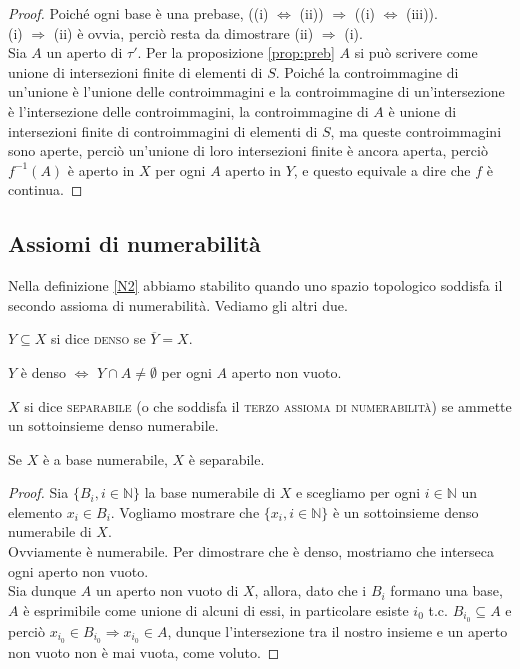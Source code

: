 \documentclass{article}
\begin{document}
\begin{proof}
	Poiché ogni base è una prebase, ((i) $\Leftrightarrow$ (ii)) $\Rightarrow$ ((i) $\Leftrightarrow$ (iii)). \\
	(i) $\Rightarrow$ (ii) è ovvia, perciò resta da dimostrare (ii) $\Rightarrow$ (i). \\
	Sia $A$ un aperto di $\tau'$. Per la proposizione \ref{prop:preb} $A$ si può scrivere come unione di intersezioni finite di elementi di $S$. Poiché la controimmagine di un'unione è l'unione delle controimmagini e la controimmagine di un'intersezione è l'intersezione delle controimmagini, la controimmagine di $A$ è unione di intersezioni finite di controimmagini di elementi di $S$, ma queste controimmagini sono aperte, perciò un'unione di loro intersezioni finite è ancora aperta, perciò $f^{-1}(A)$ è aperto in $X$ per ogni $A$ aperto in $Y$, e questo equivale a dire che $f$ è continua.
\end{proof}

\subsection{Assiomi di numerabilità}

Nella definizione \ref{N2} abbiamo stabilito quando uno spazio topologico soddisfa il secondo assioma di numerabilità. Vediamo gli altri due.

\begin{defn}
	$Y \subseteq X$ si dice \textsc{denso} se $\overline{Y}=X$.
\end{defn}

\begin{oss}
	$Y$ è denso $\Leftrightarrow$ $Y \cap A \not=\emptyset$ per ogni $A$ aperto non vuoto.
\end{oss}

\begin{defn} \label{N3}
	$X$ si dice \textsc{separabile} (o che soddisfa il \textsc{terzo assioma di numerabilità}) se ammette un sottoinsieme denso numerabile.
\end{defn}

\begin{prop} \label{N2impN3}
	Se $X$ è a base numerabile, $X$ è separabile.
\end{prop}

\begin{proof}
	Sia $\{ B_i, {i \in \mathbb{N}}\}$ la base numerabile di $X$ e scegliamo per ogni $i \in \mathbb{N}$ un elemento $x_i \in B_i$. Vogliamo mostrare che $\{ x_i, i \in \mathbb{N} \}$ è un sottoinsieme denso numerabile di $X$. \\
	Ovviamente è numerabile. Per dimostrare che è denso, mostriamo che interseca ogni aperto non vuoto. \\
	Sia dunque $A$ un aperto non vuoto di $X$, allora, dato che i $B_i$ formano una base, $A$ è esprimibile come unione di alcuni di essi, in particolare esiste $i_0$ t.c. $B_{i_0} \subseteq A$ e perciò $x_{i_0} \in B_{i_0} \Rightarrow x_{i_0} \in A$, dunque l'intersezione tra il nostro insieme e un aperto non vuoto non è mai vuota, come voluto.
\end{proof}
\end{document}
